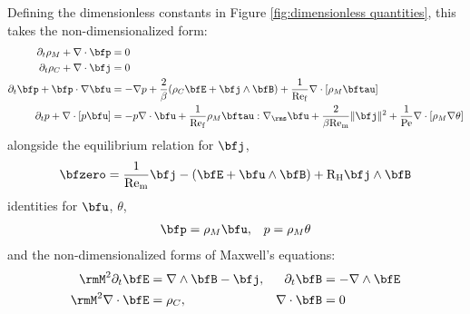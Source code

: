     Defining the dimensionless constants in Figure \ref{fig:dimensionless quantities}, this takes the non-dimensionalized form:
    \begin{align}
        \partial_{t}\rho_{M} + \nabla\cdot\bfp  &=  0  \\
        \partial_{t}\rho_{C} + \nabla\cdot\bfj  &=  0  \\
        \partial_{t}\bfp + \bfp\cdot\nabla\bfu  &=  - \nabla p + \frac{2}{\beta}(\rho_{C}\bfE + \bfj\wedge\bfB) + \frac{1}{\rmRef}\nabla\cdot[\rho_{M}\bftau]  \\
        \partial_{t}p + \nabla\cdot[p\bfu]  &=  - p\nabla\cdot\bfu + \frac{1}{\rmRef}\rho_{M}\bftau:\nabla_{\rms}\bfu + \frac{2}{\beta\rmRem}\|\bfj\|^{2} + \frac{1}{\rmPe}\nabla\cdot[\rho_{M}\nabla\theta]
    \end{align}
    alongside the equilibrium relation for $\bfj$,
    \begin{equation}
        \bfzero  =  \frac{1}{\rmRem}\bfj - \left(\bfE + \bfu\wedge\bfB\right) + \rmRH\bfj\wedge\bfB
    \end{equation}
    identities for $\bfu$, $\theta$,
    \begin{align}
        \bfp  =  \rho_{M}\bfu,  &&
        p  =  \rho_{M}\theta
    \end{align}
    and the non-dimensionalized forms of Maxwell's equations:
    \begin{align*}
        \rmM^{2}\partial_{t}\bfE  &=  \nabla\wedge\bfB - \bfj,  &
        \partial_{t}\bfB  &=  - \nabla\wedge\bfE  \\
        \rmM^{2}\nabla\cdot\bfE  &=  \rho_{C},  &
        \nabla\cdot\bfB  &=  0
    \end{align*}
    

